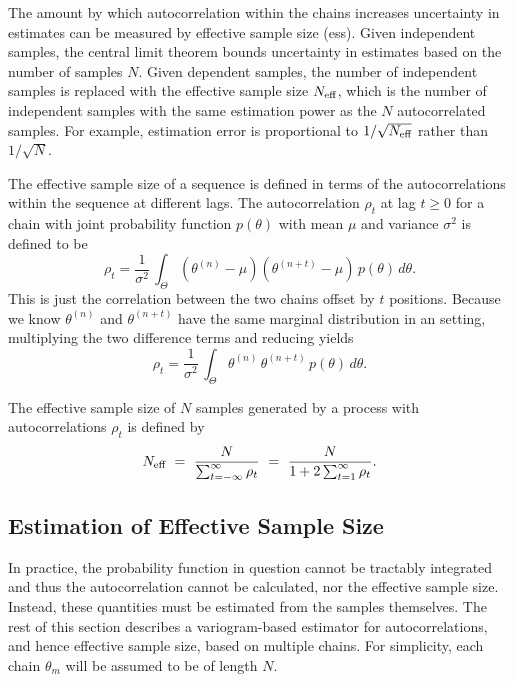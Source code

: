 The amount by which autocorrelation within the chains increases
uncertainty in estimates can be measured by effective sample size
({\sc ess}).  Given independent samples, the central limit theorem
bounds uncertainty in estimates based on the number of samples $N$.
Given dependent samples, the number of independent samples is replaced
with the effective sample size $N_{\mbox{\scriptsize eff}}$, which is
the number of independent samples with the same estimation power as
the $N$ autocorrelated samples.  For example, estimation error is
proportional to $1/\sqrt{N_{\mbox{\scriptsize eff}}}$ rather than
$1/\sqrt{N}$.

The effective sample size of a sequence is defined in terms of the
autocorrelations within the sequence at different lags.  The
autocorrelation $\rho_t$ at lag $t \geq 0$ for a chain with joint
probability function $p(\theta)$ with mean $\mu$ and variance
$\sigma^2$ is defined to be
\[
\rho_t 
= 
\frac{1}{\sigma^2} \, \int_{\Theta} (\theta^{(n)} - \mu)
(\theta^{(n+t)} - \mu) \, p(\theta) \, d\theta.
\]
This is just the correlation between the two chains offset by $t$
positions.  Because we know $\theta^{(n)}$ and $\theta^{(n+t)}$ have
the same marginal distribution in an \MCMC setting, multiplying the
two difference terms and reducing yields
\[
\rho_t
= 
\frac{1}{\sigma^2} \, \int_{\Theta} \theta^{(n)} \, \theta^{(n+t)} \, p(\theta) \, d\theta.
\]

The effective sample size of $N$ samples generated by a process with
autocorrelations $\rho_t$ is defined by
\[
N_{\mbox{\scriptsize eff}}
\ = \
\frac{N}{\sum_{t = -\infty}^{\infty} \rho_t}
\ = \
\frac{N}{1 + 2 \sum_{t = 1}^{\infty} \rho_t}.
\]

\subsection{Estimation of Effective Sample Size}

In practice, the probability function in question cannot be tractably
integrated and thus the autocorrelation cannot be calculated, nor the
effective sample size.  Instead, these quantities must be estimated
from the samples themselves.  The rest of this section describes a
variogram-based estimator for autocorrelations, and hence effective sample
size, based on multiple chains. For simplicity, each chain
$\theta_m$ will be assumed to be of length $N$.

